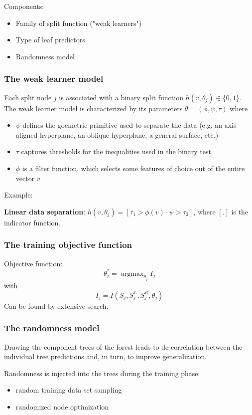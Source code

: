 \documentclass{scrartcl}
\DeclareMathOperator*{\argmax}{argmax} %
\begin{document}
\begin{appendices}
Components:
\begin{itemize}
    \item
        Family of split function ("weak learners")
    \item
        Type of leaf predictors
    \item
        Randomness model
\end{itemize}

\subsubsection{The weak learner model}
Each split node \(j\) is associated with a binary split function \(h(v, \theta_j) \in \{0,1\}\). The weak learner model is characterized by its parameters \(\theta = (\phi, \psi, \tau)\) where
\begin{itemize}
    \item
        \(\psi\) defines the goemetric primitive used to separate the data (e.g. an axis-aligned hyperplane, an oblique hyperplane, a general surface, etc.)
    \item
        \(\tau\) captures thresholds for the inequalities used in the binary test
    \item
        \(\phi\) is a filter function, which selects some features of choice out of the entire vector \(v\)
\end{itemize}

\bigbreak

Example:

\textbf{Linear data separation}: \(h(v, \theta_j) = [\tau_1 > \phi(v) \cdot \psi > \tau_2]\), where \([.]\) is the indicator function.

\subsubsection{The training objective function}
Objective function:
\[\theta_j^* = \argmax_{\theta_j} I_j\]
with
\[I_j = I(S_j, S_j^L, S_j^R, \theta_j)\]
Can be found by extensive search.

\subsubsection{The randomness model}
Drawing the component trees of the forest leads to de-correlation between the individual tree predictions and, in turn, to improve generalization.

Randomness is injected into the trees during the training phase:
\begin{itemize}
    \item
        random training data set sampling
    \item
        randomized node optimization
\end{itemize}


\end{appendices}
\end{document}
